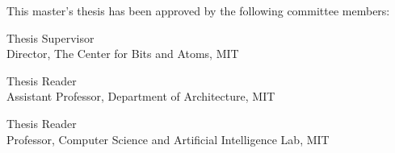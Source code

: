 %
%
%

\begin{titlepage}
\begin{large}
This master's thesis has been approved by the following committee members:

\signature{Neil Gershenfeld}{Thesis Supervisor \\
   Director, The Center for Bits and Atoms, MIT}

\signature{Caitlin Mueller}{Thesis Reader \\
   Assistant Professor, Department of Architecture, MIT}

\signature{Erik Demaine}{Thesis Reader \\
   Professor, Computer Science and Artificial Intelligence Lab, MIT}
\end{large}
\end{titlepage}

